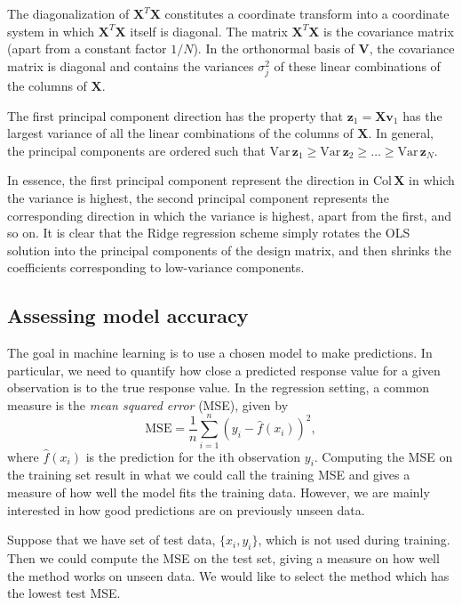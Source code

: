 \documentclass[a4paper, twocolumn]{article}
\begin{document}
The diagonalization of $\mathbf{X}^T\mathbf{X}$ constitutes a coordinate transform into a coordinate system in which $\mathbf{X}^T\mathbf{X}$ itself is diagonal. The matrix $\mathbf{X}^T\mathbf{X}$ is the covariance matrix (apart from a constant factor $1/N$). In the orthonormal basis of $\mathbf{V}$, the covariance matrix is diagonal and contains the variances $\sigma_j^2$ of these linear combinations of the columns of $\mathbf{X}$.

The first principal component direction has the property that $\mathbf{z}_1=\mathbf{X}\mathbf{v}_1$ has the largest variance of all the linear combinations of the columns of $\mathbf{X}$. In general, the principal components are ordered such that $\text{Var}\,\mathbf{z}_1\ge \text{Var}\,\mathbf{z}_2\ge\dots \ge\text{Var}\,\mathbf{z}_N$.

In essence, the first principal component represent the direction in $\text{Col}\,\mathbf{X}$ in which the variance is highest, the second principal component represents the corresponding direction in which the variance is highest, apart from the first, and so on. It is clear that the Ridge regression scheme simply rotates the OLS solution into the principal components of the design matrix, and then shrinks the coefficients corresponding to low-variance components. 

\subsection{Assessing model accuracy \label{sect:accuracy}}
The goal in machine learning is to use a chosen model to make predictions. In particular, we need to quantify how close 
a predicted response value for a given observation is to the true response value.
In the regression setting, a common measure is the \textit{mean squared error} (MSE), given by 
\begin{equation}
 \text{MSE} = \frac{1}{n} \sum_{i=1}^n \left( y_i - \hat{f}(x_i) \right)^2,
\end{equation}
where $\hat{f}(x_i)$ is the prediction for the ith observation $y_i$. Computing the MSE on the training set result in what we 
could call the training MSE and gives a measure of how well the model fits the training data. However, we are mainly interested 
in how good predictions are on previously unseen data.

Suppose that we have set of test data, $\{x_i,y_i\}$, which is not used during training. Then we could compute the MSE on 
the test set, giving a measure on how well the method works on unseen data. We would like to select the method which has 
the lowest test MSE. 
\end{document}
